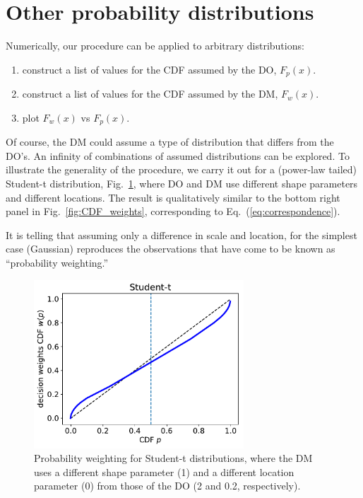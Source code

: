 \documentclass[%
	11pt,
	abstract=true,	
	bibliography=oldstyle					%
]{scrartcl}
\newcommand{\eref}[1]{Eq.~(\ref{eq:#1})}
\newcommand{\flabel}[1]{\label{fig:#1}}
\newcommand{\fref}[1]{Fig.~\ref{fig:#1}}
\numberwithin{equation}{section}
\begin{document}
\section{Other probability distributions}
Numerically, our procedure can be applied to arbitrary distributions: 
\begin{enumerate}
\item
construct a list of values for the CDF assumed by the DO, $F_p(x)$.
\item
construct a list of values for the CDF assumed by the DM, $F_w(x)$.
\item
plot $F_w(x)$ vs $F_p(x)$.
\end{enumerate}
Of course, the DM could assume a type of distribution that differs from the DO's. An infinity of combinations of assumed distributions can be explored. To illustrate the generality of the procedure, we carry it out for a (power-law tailed) Student-t distribution, \fref{other_CDFs}, where DO and DM use different shape parameters and different locations. The result is qualitatively similar to the bottom right panel in \fref{CDF_weights}, corresponding to \eref{correspondence}. 

It is telling that assuming only a difference in scale and location, for the simplest case (Gaussian) reproduces the observations that have come to be known as ``probability weighting.''

\begin{figure}[thb]
\centering
\includegraphics[width=0.7\textwidth]{./figs/Student-t.pdf}
\caption{Probability weighting for Student-t distributions, where the DM uses a different shape parameter (1) and a different location parameter (0) from those of the DO (2 and 0.2, respectively).}
\flabel{other_CDFs}
\end{figure}

\clearpage
%
\printbibliography
\end{document}
